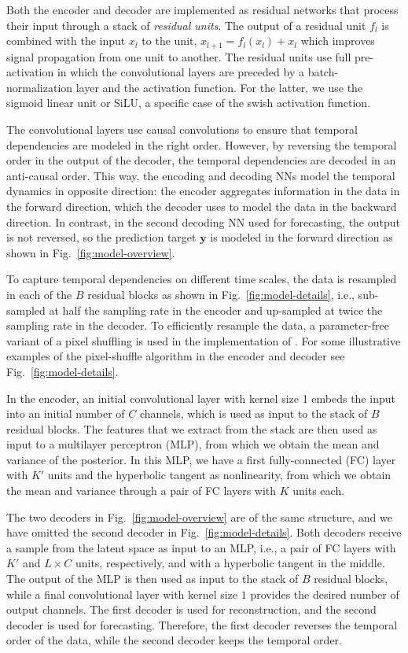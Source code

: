 \documentclass[english,a4paper,10pt]{scrartcl}
\begin{document}
Both the encoder and decoder are implemented as residual networks \citep{He.Zhang.ea.2016} that process their input through a stack of \emph{residual units}. The output of a residual unit $f_{l}$ is combined with the input $x_{l}$ to the unit, $x_{l+1}=f_{l}(x_{l})+x_{l}$ which improves signal propagation from one unit to another. The residual units use full pre-activation \citep{He.Zhang.ea.2016a} in which the convolutional layers are preceded by a batch-normalization layer and the activation function. For the latter, we use the sigmoid linear unit or SiLU, a specific case of the swish activation function.

The convolutional layers use causal convolutions to ensure that temporal dependencies are modeled in the right order. However, by reversing the temporal order in the output of the decoder, the temporal dependencies are decoded in an anti-causal order. This way, the encoding and decoding NNs model the temporal dynamics in opposite direction: the encoder aggregates information in the data in the forward direction, which the decoder uses to model the data in the backward direction. In contrast, in the second decoding NN used for forecasting, the output is not reversed, so the prediction target $\mathbf{y}$ is modeled in the forward direction as shown in Fig.~\ref{fig:model-overview}.

To capture temporal dependencies on different time scales, the data is resampled in each of the $B$ residual blocks as shown in Fig.~\ref{fig:model-details}, i.e., sub-sampled at half the sampling rate in the encoder and up-sampled at twice the sampling rate in the decoder. To efficiently resample the data, a parameter-free variant of a pixel shuffling \citep{Shi.Caballero.ea.2016} is used in the implementation of \cite{Groth.Chavez.2023}. For some illustrative examples of the pixel-shuffle algorithm in the encoder and decoder see Fig.~\ref{fig:model-details}.

In the encoder, an initial convolutional layer with kernel size 1 embeds the input into an initial number of $C$ channels, which is used as input to the stack of $B$ residual blocks. The features that we extract from the stack are then used as input to a multilayer perceptron (MLP), from which we obtain the mean and variance of the posterior. In this MLP, we have a first fully-connected (FC) layer with $K'$ units and the hyperbolic tangent as nonlinearity, from which we obtain the mean and variance through a pair of FC layers with $K$ units each.

The two decoders in Fig.~\ref{fig:model-overview} are of the same structure, and we have omitted the second decoder in Fig.~\ref{fig:model-details}. Both decoders receive a sample from the latent space as input to an MLP, i.e., a pair of FC layers with $K'$ and $L\times C$ units, respectively, and with a hyperbolic tangent in the middle. The output of the MLP is then used as input to the stack of $B$ residual blocks, while a final convolutional layer with kernel size $1$ provides the desired number of output channels. The first decoder is used for reconstruction, and the second decoder is used for forecasting. Therefore, the first decoder reverses the temporal order of the data, while the second decoder keeps the temporal order.
\end{document}
